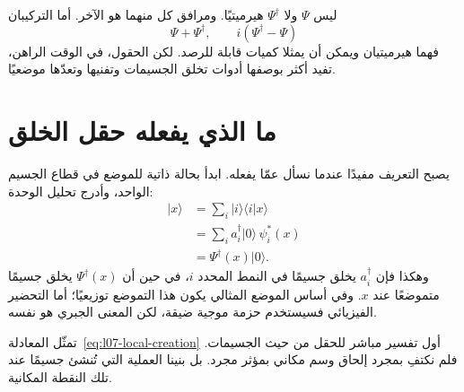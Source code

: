 ليس \(\Psi\) ولا \(\Psi^\dagger\) هيرميتيًا. ومرافق كل منهما هو الآخر. أما التركيبان
\begin{equation}
\Psi+\Psi^\dagger,
\qquad
i(\Psi^\dagger-\Psi)
\label{eq:l07-hermitian-combinations}
\end{equation}
فهما هيرميتيان ويمكن أن يمثلا كميات قابلة للرصد. لكن الحقول، في الوقت الراهن، تفيد أكثر بوصفها أدوات تخلق الجسيمات وتفنيها وتعدّها موضعيًا.

\begin{classroomqa}
\end{classroomqa}

\section{ما الذي يفعله حقل الخلق}

يصبح التعريف مفيدًا عندما نسأل عمّا يفعله. ابدأ بحالة ذاتية للموضع في قطاع الجسيم الواحد، وأدرج تحليل الوحدة:
\begin{align}
|x\rangle
&=\sum_i |i\rangle\langle i|x\rangle \\
&=\sum_i a_i^\dagger|0\rangle\,\psi_i^*(x) \\
&=\Psi^\dagger(x)|0\rangle.
\label{eq:l07-local-creation}
\end{align}
وهكذا فإن \(a_i^\dagger\) يخلق جسيمًا في النمط المحدد \(i\)، في حين أن \(\Psi^\dagger(x)\) يخلق جسيمًا متموضعًا عند \(x\). وفي أساس الموضع المثالي يكون هذا التموضع توزيعيًا؛ أما التحضير الفيزيائي فسيستخدم حزمة موجية ضيقة، لكن المعنى الجبري هو نفسه.

\begin{classroomqa}
\end{classroomqa}

تمثّل المعادلة~\eqref{eq:l07-local-creation} أول تفسير مباشر للحقل من حيث الجسيمات. فلم نكتفِ بمجرد إلحاق وسم مكاني بمؤثر مجرد. بل بنينا العملية التي تُنشئ جسيمًا عند تلك النقطة المكانية.

\begin{classroomqa}
\end{classroomqa}

